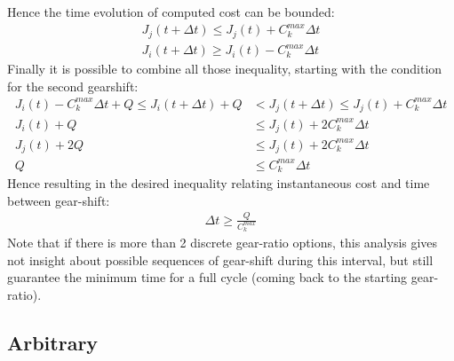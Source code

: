 %
Hence the time evolution of computed cost can be bounded:
%
\begin{align}
J_j(t+\Delta t) \leq J_j(t)  + C_k^{max} \Delta t \\
J_i(t+\Delta t) \geq J_i(t)  - C_k^{max} \Delta t 
\end{align}
%
Finally it is possible to combine all those inequality, starting with the condition for the second gearshift:
%
\begin{align}
J_i(t)  - C_k^{max} \Delta t + Q \leq J_i(t+\Delta t) + Q &< J_j(t+\Delta t) \leq J_j(t)  + C_k^{max} \Delta t \\
J_i(t) + Q &\leq J_j(t)  + 2 C_k^{max} \Delta t \\
J_j(t) + 2 Q &\leq J_j(t)  + 2 C_k^{max} \Delta t \\
Q &\leq C_k^{max} \Delta t 
\end{align}
%
Hence resulting in the desired inequality relating instantaneous cost and time between gear-shift:
%
\begin{align}
\Delta t \geq \frac{Q}{C_k^{max}}
\end{align}
%
Note that if there is more than 2 discrete gear-ratio options, this analysis gives not insight about possible sequences of gear-shift during this interval, but still guarantee the minimum time for a full cycle (coming back to the starting gear-ratio).







\subsection{Arbitrary}
\label{sec:chat2}

